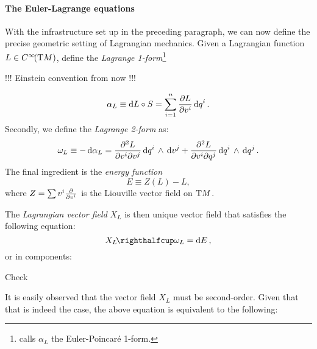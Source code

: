\paragraph{The Euler-Lagrange equations} With the infrastructure set up in the preceding paragraph, we can now define the precise geometric setting of Lagrangian mechanics. Given a Lagrangian function $L \in C^\infty\!\qty(\mathrm{T}M)$, define the \emph{Lagrange 1-form}\footnote
{\citet{Carinena1990} calls $\alpha_L$ the Euler-Poincaré 1-form.}

!!! Einstein convention from now !!!

\begin{equation}
    \alpha_L \equiv \dd{L} \circ S = \sum_{i=1}^n \pdv{L}{v^i}\dd{q^i}.
\end{equation}
Secondly, we define the \emph{Lagrange 2-form} as: \cite{Abraham1978,Carinena1990}
\begin{equation}
    \omega_L \equiv - \dd{\alpha}_L = \pdv[2]{L}{v^i}{v^j} \dd{q^i}\,\wedge\,\dd{v^j}  + \pdv[2]{L}{v^i}{q^j} \dd{q^i}\,\wedge\,\dd{q^j} .
\end{equation}
The final ingredient is the \emph{energy function}
$$ E \equiv Z(L) - L, $$
where $Z = \sum v^i \pdv{}{v^i}$ is the Liouville vector field on $\mathrm{T}M$.

The \emph{Lagrangian vector field} $X_L$ is then unique vector field that satisfies the following equation:
\begin{equation}
    \intpr{X_L}{\omega_L} = \dd{E},
\end{equation}
or in components:

Check \citet[p. 170]{Godbillon1969}

It is easily observed that the vector field $X_L$ must be second-order. Given that that is indeed the case, the above equation is equivalent to the following:

